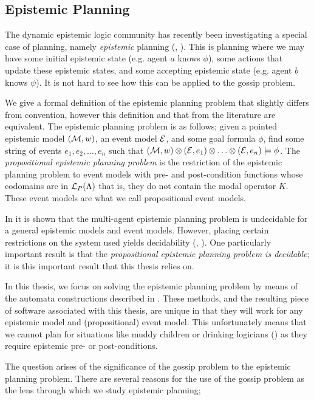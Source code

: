 \documentclass[10pt, a4paper]{report}
\begin{document}
\subsection{Epistemic Planning}

The dynamic epistemic logic community has recently been investigating a special case
of planning, namely \emph{epistemic} planning (\cite{BolanderEP},
\cite{UndecidabilityEP}). This is planning where we may have some initial
epistemic state (e.g. agent $a$ knows $\phi$), some actions that update these
epistemic states, and some accepting epistemic state (e.g. agent $b$ knows
$\psi$). It is not hard to see how this can be applied to the gossip problem.

We give a formal definition of the epistemic planning problem that slightly
differs from convention, however this definition and that from the literature
are equivalent. The epistemic planning problem is as follows; given a pointed
epistemic model $(\mathcal{M}, w)$, an event model $\mathcal{E}$, and some goal formula
$\phi$, find some string of events ${e_1, e_2, \ldots, e_n}$ such that $(\mathcal{M},
w) \otimes (\mathcal{E}, e_1) \otimes \ldots \otimes (\mathcal{E}, e_n) \models \phi$. The
\emph{propositional epistemic planning problem} is the restriction of the
epistemic planning problem to event models with pre- and post-condition
functions whose codomains are in $\mathcal{L}_P(\Lambda)$ that is, they do not
contain the modal operator $K$. These event models are what we call
propositional event models.

In \cite{BolanderEP} it is shown that the multi-agent epistemic planning problem
is undecidable for a general epistemic models and event models. However, placing
certain restrictions on the system used yields decidability
(\cite{DecidabilityEp}, \cite{AutomataTechniques}). One particularly important
result is that the \emph{propositional epistemic planning problem is decidable};
it is this important result that this thesis relies on.

In this thesis, we focus on solving the epistemic planning problem by means of
the automata constructions described in \cite{AutomataTechniques}. These
methods, and the resulting piece of software associated with this thesis, are
unique in that they will work for any epistemic model and (propositional) event
model. This unfortunately means that we cannot plan for situations like muddy
children or drinking logicians (\cite{DEMO-S5}) as they require epistemic pre-
or post-conditions. 

The question arises of the significance of the gossip problem to the epistemic
planning problem. There are several reasons for the use of the gossip problem
as the lens through which we study epistemic planning; 
\end{document}
